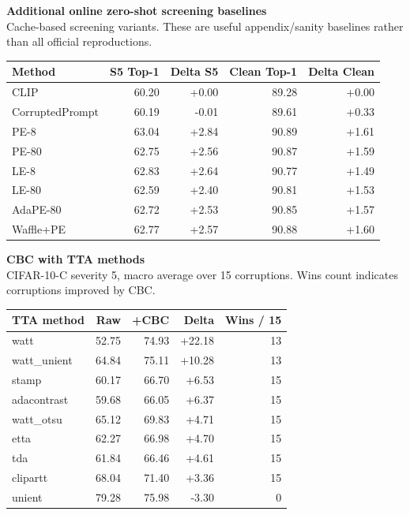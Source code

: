 \documentclass[11pt]{article}
\begin{document}
\clearpage
\begin{center}
{\Large\bfseries Additional online zero-shot screening baselines}\\[-0.5mm]
{\normalsize Cache-based screening variants. These are useful appendix/sanity baselines rather than all official reproductions.}
\end{center}
\vspace{1mm}
{\scriptsize
\begin{tabular}{lrrrr}
\toprule
Method & S5 Top-1 & Delta S5 & Clean Top-1 & Delta Clean \\
\midrule
CLIP & 60.20 & +0.00 & 89.28 & +0.00 \\
CorruptedPrompt & 60.19 & -0.01 & 89.61 & +0.33 \\
PE-8 & 63.04 & +2.84 & 90.89 & +1.61 \\
PE-80 & 62.75 & +2.56 & 90.87 & +1.59 \\
LE-8 & 62.83 & +2.64 & 90.77 & +1.49 \\
LE-80 & 62.59 & +2.40 & 90.81 & +1.53 \\
AdaPE-80 & 62.72 & +2.53 & 90.85 & +1.57 \\
Waffle+PE & 62.77 & +2.57 & 90.88 & +1.60 \\
\bottomrule
\end{tabular}
}

\clearpage
\begin{center}
{\Large\bfseries CBC with TTA methods}\\[-0.5mm]
{\normalsize CIFAR-10-C severity 5, macro average over 15 corruptions. Wins count indicates corruptions improved by CBC.}
\end{center}
\vspace{1mm}
{\scriptsize
\begin{tabular}{lrrrr}
\toprule
TTA method & Raw & +CBC & Delta & Wins / 15 \\
\midrule
watt & 52.75 & 74.93 & +22.18 & 13 \\
watt\_unient & 64.84 & 75.11 & +10.28 & 13 \\
stamp & 60.17 & 66.70 & +6.53 & 15 \\
adacontrast & 59.68 & 66.05 & +6.37 & 15 \\
watt\_otsu & 65.12 & 69.83 & +4.71 & 15 \\
etta & 62.27 & 66.98 & +4.70 & 15 \\
tda & 61.84 & 66.46 & +4.61 & 15 \\
clipartt & 68.04 & 71.40 & +3.36 & 15 \\
unient & 79.28 & 75.98 & -3.30 & 0 \\
\bottomrule
\end{tabular}
}
\end{document}
